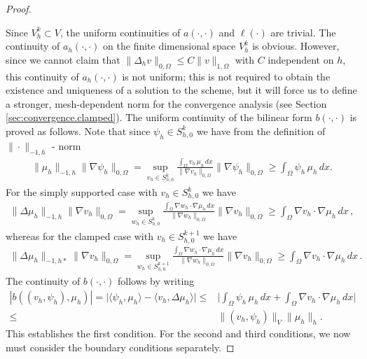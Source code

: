 \documentclass[a4paper,final]{siamltex}
\begin{document}
\begin{proof}
\begin{enumerate}
\end{enumerate}
Since $V^k_h \subset V$, the uniform continuities of $a(\cdot,\cdot)$ and $\ell(\cdot)$
are trivial. The continuity of $a_h(\cdot,\cdot)$ on the finite dimensional space
$V^k_h$ is obvious. However, since we cannot claim that $\|\Delta_h v\|_{0,\Omega}
\le C\|v\|_{1,\Omega}$ with $C$ independent on $h$, this continuity of $a_h(\cdot,\cdot)$ is
not uniform; this is not required to obtain the existence and uniqueness of a solution to the
scheme, but it will force us to  define a stronger, mesh-dependent norm for the convergence analysis (see
Section \ref{sec:convergence.clamped}).
 The uniform continuity of the bilinear form $b(\cdot, \cdot)$ is
proved as follows.  Note that since $\psi_h \in S_{h,0}^k$ we have from the
definition of $\|\cdot\|_{-1,h}$ - norm 
\begin{eqnarray*}
\|\mu_h\|_{-1,h} \|\nabla\psi_h\|_{0,\Omega} = \sup_{v_h \in S_{h,0}^k}\frac{
\int_{\Omega} v_h\,\mu_h\,dx }{\|\nabla v_h\|_{0,\Omega}} \|\nabla\psi_h\|_{0,\Omega}\geq 
\int_{\Omega} \psi_h\,\mu_h\,dx.
 \end{eqnarray*}
For the simply supported case with $v_h \in  S_{h,0}^k$ we have 
\begin{eqnarray*}
\|\Delta \mu_h\|_{-1,h} \|\nabla v_h\|_{0,\Omega} = \sup_{w_h \in S_{h,0}^k}\frac{
\int_{\Omega} \nabla w_h\cdot \nabla\mu_h\,dx }{\|\nabla w_h\|_{0,\Omega}} \|\nabla v_h\|_{0,\Omega}\geq 
\int_{\Omega} \nabla v_h\cdot \nabla\mu_h\,dx\,, 
 \end{eqnarray*}
whereas for the clamped case with $v_h \in  S_{h,0}^{k+1}$ we have 
\begin{eqnarray*}
\|\Delta \mu_h\|_{-1,h*} \|\nabla v_h\|_{0,\Omega} = \sup_{w_h \in S_{h,0}^{k+1}}\frac{
\int_{\Omega} \nabla w_h\cdot \nabla\mu_h\,dx }{\|\nabla w_h\|_{0,\Omega}} \|\nabla v_h\|_{0,\Omega}\geq 
\int_{\Omega} \nabla v_h\cdot \nabla\mu_h\,dx\,. 
 \end{eqnarray*}
The continuity of $b(\cdot,\cdot)$ follows by writing
\begin{align*}
|b((v_h,\psi_h),\mu_h)| = 
\bigg|\langle\psi_h, \mu_h \rangle - 
\langle v_h,\Delta \mu_h\rangle \bigg|   \leq{}& \bigg|\int_{\Omega} \psi_h\,\mu_h\,dx
+ \int_{\Omega} \nabla v_h\cdot \nabla\mu_h\,dx \bigg|\\
\leq{}& \|(v_h,\psi_h)\|_{V} \|\mu_h\|_{h}. 
\end{align*}
This establishes the first condition.
For the second and third conditions, we now must consider the boundary conditions
separately. 


\end{proof}
\end{document}
